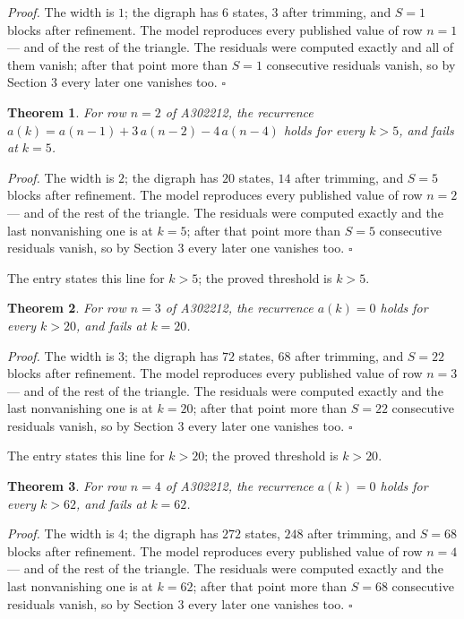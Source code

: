 \documentclass[11pt]{article}
\newtheorem{theorem}{Theorem}
\theoremstyle{definition}
\begin{document}
{\itshape Proof.} The width is $1$; the digraph has $6$ states, $3$ after trimming, and $S = 1$ blocks after refinement. The model reproduces every published value of row $n = 1$ --- and of the rest of the triangle. The residuals were computed exactly and all of them vanish; after that point more than $S = 1$ consecutive residuals vanish, so by Section 3 every later one vanishes too. $\square$

\begin{theorem} For row $n = 2$ of A302212, the recurrence $a(k) = a(n-1) + 3\,a(n-2) - 4\,a(n-4)$ holds for every $k > 5$, and fails at $k = 5$.\end{theorem}

{\itshape Proof.} The width is $2$; the digraph has $20$ states, $14$ after trimming, and $S = 5$ blocks after refinement. The model reproduces every published value of row $n = 2$ --- and of the rest of the triangle. The residuals were computed exactly and the last nonvanishing one is at $k = 5$; after that point more than $S = 5$ consecutive residuals vanish, so by Section 3 every later one vanishes too. $\square$

The entry states this line for $k > 5$; the proved threshold is $k > 5$.

\begin{theorem} For row $n = 3$ of A302212, the recurrence $a(k) = 0$ holds for every $k > 20$, and fails at $k = 20$.\end{theorem}

{\itshape Proof.} The width is $3$; the digraph has $72$ states, $68$ after trimming, and $S = 22$ blocks after refinement. The model reproduces every published value of row $n = 3$ --- and of the rest of the triangle. The residuals were computed exactly and the last nonvanishing one is at $k = 20$; after that point more than $S = 22$ consecutive residuals vanish, so by Section 3 every later one vanishes too. $\square$

The entry states this line for $k > 20$; the proved threshold is $k > 20$.

\begin{theorem} For row $n = 4$ of A302212, the recurrence $a(k) = 0$ holds for every $k > 62$, and fails at $k = 62$.\end{theorem}

{\itshape Proof.} The width is $4$; the digraph has $272$ states, $248$ after trimming, and $S = 68$ blocks after refinement. The model reproduces every published value of row $n = 4$ --- and of the rest of the triangle. The residuals were computed exactly and the last nonvanishing one is at $k = 62$; after that point more than $S = 68$ consecutive residuals vanish, so by Section 3 every later one vanishes too. $\square$
\end{document}
